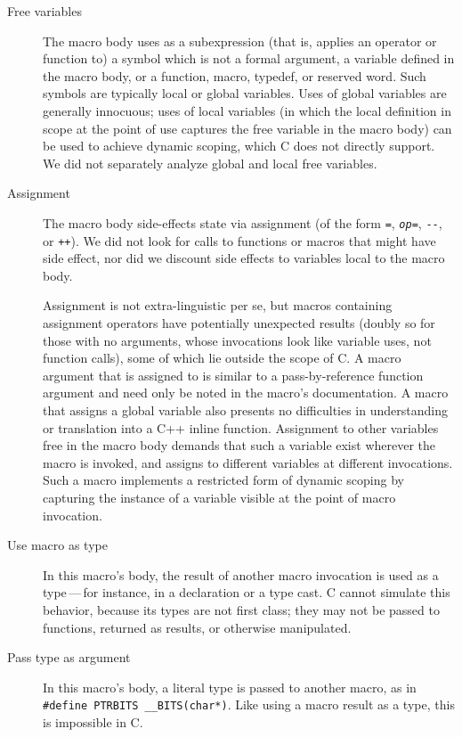 \label{desc:properties}

\begin{description}
\item[Free variables]\label{page:freevar}
  The macro body uses as a subexpression (that is, applies an operator or
  function to) a symbol which is not a formal argument, a variable defined
  in the macro body, or a function, macro, typedef, or reserved word.  Such
  symbols are typically local or global variables.  Uses of global
  variables are generally innocuous; uses of local variables (in which the
  local definition in scope at the point of use captures the free variable
  in the macro body) can be used to achieve dynamic scoping, which C does
  not directly support.  We did not separately analyze global and local
  free variables.

\item[Assignment]
  The macro body side-effects state via assignment (of the form {\tt =},
  {\tt {\em op}=}, {\tt -{}-}, or {\tt ++}).  We did not look for calls to
  functions or macros that might have side effect, nor did we discount side
  effects to variables local to the macro body.  
  
  Assignment is not extra-linguistic per se, but macros containing
  assignment operators have potentially unexpected results (doubly so for
  those with no arguments, whose invocations look like variable uses, not
  function calls), some of which lie outside the scope of C\@.  A macro
  argument that is assigned to is similar to a pass-by-reference function
  argument and need only be noted in the macro's documentation.  A macro
  that assigns a global variable also presents no difficulties in
  understanding or translation into a C++ inline function.  Assignment to
  other variables free in the macro body demands that such a variable exist
  wherever the macro is invoked, and assigns to different variables at
  different invocations.  Such a macro implements a restricted form of
  dynamic scoping by capturing the instance of a variable visible at the
  point of macro invocation.

\item[Use macro as type]
  In this macro's body, the result of another macro invocation is used as a
  type\,---\,for instance, in a declaration or a type cast.  C cannot
  simulate this behavior, because its types are not first class; they may
  not be passed to functions, returned as results, or otherwise
  manipulated.

\item[Pass type as argument]
  In this macro's body, a literal type is passed to another macro, as in
  {\tt \#define PTRBITS \verb|__BITS|(char*)}.  Like using a macro result
  as a type, this is impossible in C\@.


\end{description}
